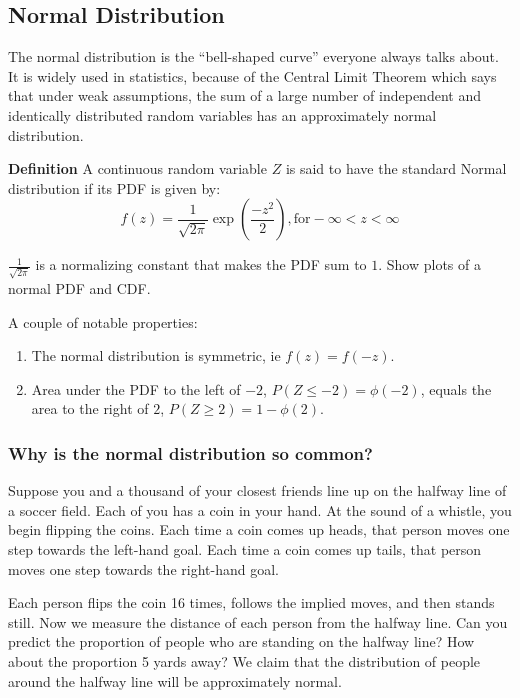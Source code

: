 \documentclass[]{article}
\begin{document}
\subsection{Normal Distribution}

The normal distribution is the ``bell-shaped curve'' everyone always talks about. It is widely used in statistics, because of the Central Limit Theorem which says that under weak assumptions, the sum of a large number of independent and identically distributed random variables has an approximately normal distribution.

\textbf{Definition} A continuous random variable $Z$ is said to have the standard Normal distribution if its PDF is given by:
\begin{equation}
	f(z) = \frac{1}{\sqrt{2 \pi}} \exp \left(\frac{-z^{2}}{2} \right), \textrm{for} -\infty < z < \infty
\end{equation}

$\frac{1}{\sqrt{2\pi}}$ is a normalizing constant that makes the PDF sum to $1$. Show plots of a normal PDF and CDF.

A couple of notable properties:
\begin{enumerate}
\item The normal distribution is symmetric, ie $f(z) = f(-z)$.
\item Area under the PDF to the left of $-2$, $P(Z \leq -2) = \phi(-2)$, equals the area to the right of $2$, $P(Z \geq 2) = 1 - \phi(2)$.
\end{enumerate}

\subsubsection{Why is the normal distribution so common?}

Suppose you and a thousand of your closest friends line up on the halfway line of a soccer field. Each of you has a coin in your hand. At the sound of a whistle, you begin flipping the coins. Each time a coin comes up heads, that person moves one step towards the left-hand goal. Each time a coin comes up tails, that person moves one step towards the right-hand goal.

Each person flips the coin 16 times, follows the implied moves, and then stands still. Now we measure the distance of each person from the halfway line. Can you predict the proportion of people who are standing on the halfway line? How about the proportion 5 yards away? We claim that the distribution of people around the halfway line will be approximately normal.
\end{document}
